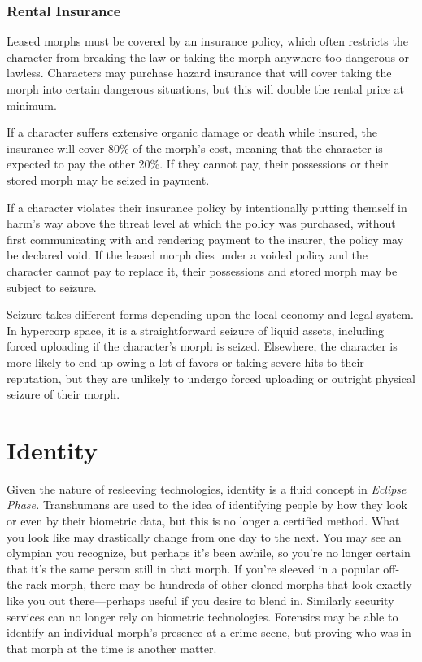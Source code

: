 \subsubsection{Rental Insurance}

Leased morphs must be covered by an insurance 
policy, which often restricts the character from 
breaking the law or taking the morph anywhere 
too dangerous or lawless. Characters may purchase 
hazard insurance that will cover taking the morph 
into certain dangerous situations, but this will 
double the rental price at minimum.

If a character suffers extensive organic damage or 
death while insured, the insurance will cover 80\% 
of the morph's cost, meaning that the character is 
expected to pay the other 20\%. If they cannot pay, 
their possessions or their stored morph may be 
seized in payment.

If a character violates their insurance policy by 
intentionally putting themself in harm's way above 
the threat level at which the policy was purchased, 
without first communicating with and rendering payment
to the insurer, the policy may be declared void.
If the leased morph dies under a voided policy and 
the character cannot pay to replace it, their possessions
and stored morph may be subject to seizure.

Seizure takes different forms depending upon the 
local economy and legal system. In hypercorp space, 
it is a straightforward seizure of liquid assets, including
forced uploading if the character's morph is
seized. Elsewhere, the character is more likely to end 
up owing a lot of favors or taking severe hits to their 
reputation, but they are unlikely to undergo forced 
uploading or outright physical seizure of their morph.

\section{Identity}

Given the nature of resleeving technologies, identity 
is a fluid concept in \textit{Eclipse Phase.} Transhumans are 
used to the idea of identifying people by how they 
look or even by their biometric data, but this is no 
longer a certified method. What you look like may 
drastically change from one day to the next. You 
may see an olympian you recognize, but perhaps it's 
been awhile, so you're no longer certain that it's the 
same person still in that morph. If you're sleeved in a 
popular off-the-rack morph, there may be hundreds 
of other cloned morphs that look exactly like you out 
there—perhaps useful if you desire to blend in. Similarly
security services can no longer rely on biometric
technologies. Forensics may be able to identify an individual
morph's presence at a crime scene, but proving
who was in that morph at the time is another matter.

